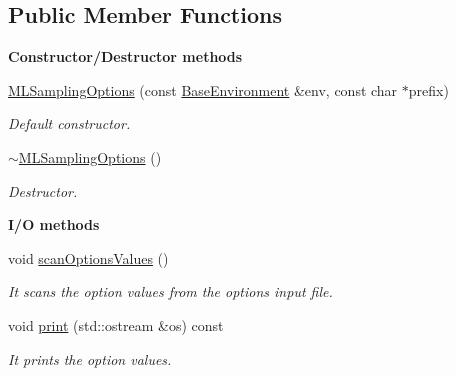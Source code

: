\subsection*{Public Member Functions}
\begin{Indent}{\bf Constructor/\-Destructor methods}\par
\begin{DoxyCompactItemize}
\item 
\hyperlink{class_q_u_e_s_o_1_1_m_l_sampling_options_abdbf362961e3abf0f375da5c7ca31907}{M\-L\-Sampling\-Options} (const \hyperlink{class_q_u_e_s_o_1_1_base_environment}{Base\-Environment} \&env, const char $\ast$prefix)
\begin{DoxyCompactList}\small\item\em Default constructor. \end{DoxyCompactList}\item 
\hyperlink{class_q_u_e_s_o_1_1_m_l_sampling_options_a7494c07488ccee22c202462769aa2fc5}{$\sim$\-M\-L\-Sampling\-Options} ()
\begin{DoxyCompactList}\small\item\em Destructor. \end{DoxyCompactList}\end{DoxyCompactItemize}
\end{Indent}
\begin{Indent}{\bf I/\-O methods}\par
\begin{DoxyCompactItemize}
\item 
void \hyperlink{class_q_u_e_s_o_1_1_m_l_sampling_options_ac30d28bbd4eea520fbbcfa5641dc62e1}{scan\-Options\-Values} ()
\begin{DoxyCompactList}\small\item\em It scans the option values from the options input file. \end{DoxyCompactList}\item 
void \hyperlink{class_q_u_e_s_o_1_1_m_l_sampling_options_a507134cba6c1c525f6684122c7d90ccc}{print} (std\-::ostream \&os) const 
\begin{DoxyCompactList}\small\item\em It prints the option values. \end{DoxyCompactList}\end{DoxyCompactItemize}
\end{Indent}
